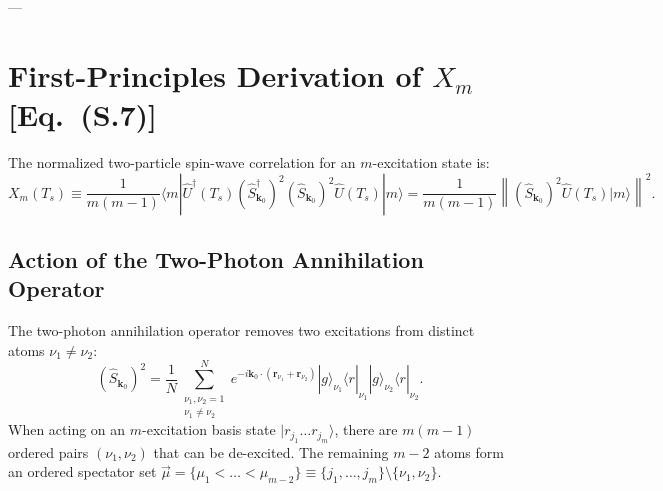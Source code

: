 \documentclass[11pt,a4paper]{article}
\begin{document}
---

\section{First-Principles Derivation of $X_m$ [Eq.~(S.7)]}

The normalized two-particle spin-wave correlation for an $m$-excitation state is:
\begin{equation}
    X_m(T_s) \equiv \frac{1}{m(m - 1)} \langle m | \hat{U}^\dagger(T_s) (\hat{S}_{\mathbf{k}_0}^\dagger)^2 (\hat{S}_{\mathbf{k}_0})^2 \hat{U}(T_s) | m \rangle = \frac{1}{m(m - 1)} \left\| (\hat{S}_{\mathbf{k}_0})^2 \hat{U}(T_s) | m \rangle \right\|^2.
    \label{eq:Xm_def}
\end{equation}

\subsection{Action of the Two-Photon Annihilation Operator}
The two-photon annihilation operator removes two excitations from distinct atoms $\nu_1 \ne \nu_2$:
\begin{equation}
    (\hat{S}_{\mathbf{k}_0})^2 = \frac{1}{N} \sum_{\substack{\nu_1, \nu_2 = 1 \\ \nu_1 \ne \nu_2}}^N e^{-i \mathbf{k}_0 \cdot (\mathbf{r}_{\nu_1} + \mathbf{r}_{\nu_2})} |g\rangle_{\nu_1}\langle r|_{\nu_1} |g\rangle_{\nu_2}\langle r|_{\nu_2}.
\end{equation}
When acting on an $m$-excitation basis state $|r_{j_1} \dots r_{j_m}\rangle$, there are $m(m - 1)$ ordered pairs $(\nu_1, \nu_2)$ that can be de-excited. The remaining $m - 2$ atoms form an ordered spectator set $\vec{\mu} = \{\mu_1 < \dots < \mu_{m-2}\} \equiv \{j_1, \dots, j_m\} \setminus \{\nu_1, \nu_2\}$.
\end{document}
